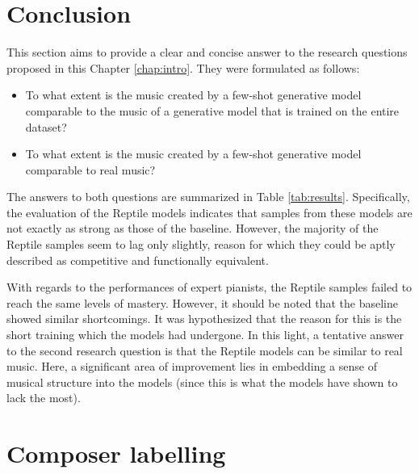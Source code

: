 \documentclass[a4paper]{book}
\begin{document}
\chapter{Conclusion}\label{chap:conclusion}

This section aims to provide a clear and concise answer to the research questions proposed in this Chapter \ref{chap:intro}. They were formulated as follows:

\begin{itemize}
    \item To what extent is the music created by a few-shot generative model comparable to the music of a generative model that is trained on the entire dataset?
    \item To what extent is the music created by a few-shot generative model comparable to real music?
\end{itemize}

The answers to both questions are summarized in Table \ref{tab:results}. Specifically, the evaluation of the Reptile models indicates that samples from these models are not exactly as strong as those of the baseline. However, the majority of the Reptile samples seem to lag only slightly, reason for which they could be aptly described as competitive and functionally equivalent.

With regards to the performances of expert pianists, the Reptile samples failed to reach the same levels of mastery. However, it should be noted that the baseline showed similar shortcomings. It was hypothesized that the reason for this is the short training which the models had undergone. In this light, a tentative answer to the second research question is that the Reptile models can be similar to real music. Here, a significant area of improvement lies in embedding a sense of musical structure into the models (since this is what the models have shown to lack the most).

\sloppy
\printbibliography

\appendix

\chapter{Composer labelling} \label{appendix:labelling}
\end{document}
